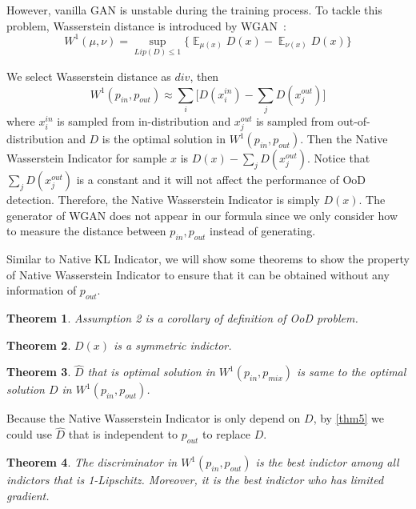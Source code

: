 \documentclass[letterpaper]{article} %
\newtheorem{theorem}{Theorem}
\newcommand{\E}{\operatorname{\mathbb{E}}}
\newcommand{\pin}{p_{in}}
\newcommand{\pout}{p_{out}}
\newcommand{\pmix}{p_{mix}}
\begin{document}
However, vanilla GAN is unstable during the training process. To tackle this problem, Wasserstein distance is introduced by WGAN~\cite{arjovsky2017wasserstein}:
\begin{equation}
	W^1(\mu, \nu) = \sup_{Lip(D) \leq 1} \{\E_{\mu(x)} D(x)  - \E_{\nu(x)} D(x)\}
\end{equation}

We select Wasserstein distance as $div$, then
\begin{equation}
	W^1(\pin, \pout) \approx \sum_i \Big[D(x_i^{in}) - \sum_j D(x_j^{out})\Big]
\end{equation} 
where $x_i^{in}$ is sampled from in-distribution and $x_j^{out}$ is sampled from out-of-distribution and $D$ is the optimal solution in $W^1(\pin, \pout)$. Then the Native Wasserstein Indicator for sample $x$ is $D(x) - \sum_{j} D(x_j^{out})$. Notice that $\sum_{j} D(x_j^{out})$ is a constant and it will not affect the performance of OoD detection. Therefore, the Native Wasserstein Indicator is simply $D(x)$. The generator of WGAN does not appear in our formula since we only consider how to measure the distance between $\pin, \pout$ instead of generating. 

Similar to Native KL Indicator, we will show some theorems to show the property of Native Wasserstein Indicator to ensure that it can be obtained without any information of $\pout$. 

\begin{theorem}\label{thm6}
	Assumption 2 is a corollary of definition of OoD problem.  
\end{theorem}

\begin{theorem}\label{thm7}
	$D(x)$ is a symmetric indictor. 
\end{theorem}

\begin{theorem}\label{thm8}
	$\hat{D}$ that is optimal solution in $W^1(\pin, \pmix)$ is same to the optimal solution $D$ in $W^1(\pin, \pout)$. 
\end{theorem}

Because the Native Wasserstein Indicator is only depend on $D$, by \cref{thm5} we could use $\hat{D}$ that is independent to $\pout$ to replace $D$. 

\begin{theorem}\label{thm9}
	The discriminator in $W^1(\pin, \pout)$ is the best indictor among all indictors that is 1-Lipschitz. Moreover, it is the best indictor who has limited gradient. 
\end{theorem}
\end{document}
